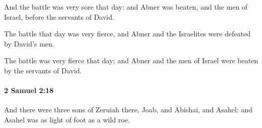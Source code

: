 			\begin{versebox}
					\item[BHS] 
					\item[ASV] And the battle was very sore that day: and Abner was beaten, and the men of Israel, before the servants of David.
					\item[NIV] The battle that day was very fierce, and Abner and the Israelites were defeated by David’s men.
					\item[NRSV] The battle was very fierce that day; and Abner and the men of Israel were beaten by the servants of David.
			\end{versebox}

		\paragraph{2 Samuel 2:18} %
			\label{2SAMUEL-2-18}

			And there were three sons of Zeruiah there, Joab, and Abishai, and Asahel: and Asahel was as light of foot as a wild roe.


